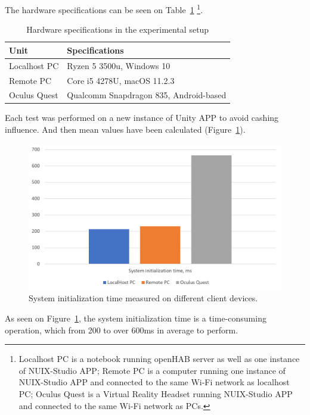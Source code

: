 The hardware specifications can be seen on Table~\ref{tab:hardware-specifications-table} \footnote{Localhost PC is a notebook running openHAB server as well as one instance of NUIX-Studio APP; Remote PC is a computer running one instance of NUIX-Studio APP and connected to the same Wi-Fi network as localhost PC; Oculus Quest is a Virtual Reality Headset running NUIX-Studio APP and connected to the same Wi-Fi network as PCs.}.

\begin{table}
  \centering
  \begin{threeparttable}[c]
    \caption{Hardware specifications in the experimental setup}
    \label{tab:hardware-specifications-table}
    \begin{tabular}{ll}
      \toprule
      Unit    &         Specifications                 \\
      \midrule
      Localhost PC & Ryzen 5 3500u, Windows 10 \\
      Remote PC & Core i5 4278U, macOS 11.2.3    \\
      Oculus Quest        & Qualcomm Snapdragon 835, Android-based            \\
      \bottomrule
    \end{tabular}
  \end{threeparttable}
\end{table}

Each test was performed on a new instance of Unity APP to avoid cashing influence. And then mean values have been calculated (Figure~\ref{fig:SystemInitTime-figure}).

\begin{figure}
  \centering
  \includegraphics[width=0.9\linewidth]{figures/SystemInitTime.png}
  \caption{System initialization time measured on different client devices.}
  \label{fig:SystemInitTime-figure}
\end{figure}

As seen on Figure~\ref{fig:SystemInitTime-figure}, the system initialization time is a time-consuming operation, which from 200 to over 600ms in average to perform.


